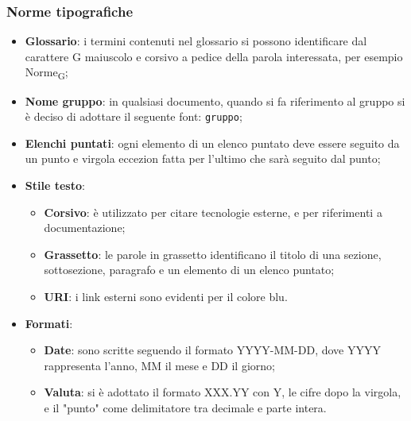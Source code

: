 \subsubsection{Norme tipografiche}
\begin{itemize}
	\item \textbf{Glossario}: i termini contenuti nel glossario si possono identificare dal carattere G maiuscolo e corsivo a pedice della parola interessata, per esempio Norme\textsubscript{G};	 		
	\item \textbf{Nome gruppo}: in qualsiasi documento, quando si fa riferimento al gruppo si è deciso di adottare il seguente font: \texttt{gruppo};
	\item \textbf{Elenchi puntati}: ogni elemento di un elenco puntato deve essere seguito da un punto e virgola eccezion fatta per l'ultimo che sarà seguito dal punto;
	\item \textbf{Stile testo}:
	\begin{itemize}
		\item \textbf{Corsivo}: è utilizzato per citare tecnologie esterne, e per riferimenti a documentazione;	
		\item \textbf{Grassetto}: le parole in grassetto identificano il titolo di una sezione, sottosezione, paragrafo e un elemento di un elenco puntato;
		\item \textbf{URI}:	i link esterni sono evidenti per il colore blu.
	\end{itemize}
	\item \textbf{Formati}:
	\begin{itemize}
		\item \textbf{Date}: sono scritte seguendo il formato YYYY-MM-DD, dove YYYY rappresenta l'anno, MM il mese e DD il giorno;
		\item \textbf{Valuta}: si è adottato il formato XXX.YY con Y, le cifre dopo la virgola, e il "punto" come delimitatore tra decimale e parte intera.
	\end{itemize}
\end{itemize}


